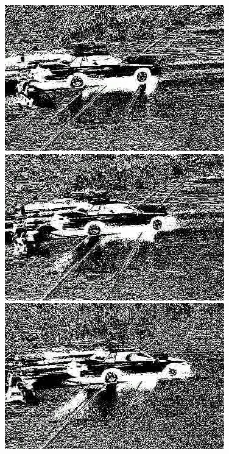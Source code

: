 \documentclass[a4paper]{ctexart}
\begin{document}
\begin{enumerate}[label=\arabic*、]
\begin{figure}[htbp]
\begin{minipage}[t]{0.2\textwidth}
		\end{minipage}
		\begin{minipage}[t]{0.2\textwidth}
			\centering
			\includegraphics[width=\textwidth]{figure/frames/avg19405.jpg}
		\end{minipage}
		\begin{minipage}[t]{0.2\textwidth}
			\centering
			\includegraphics[width=\textwidth]{figure/frames/avg19410.jpg}
		\end{minipage}
		\begin{minipage}[t]{0.2\textwidth}
			\centering
			\includegraphics[width=\textwidth]{figure/frames/avg19415.jpg}

\end{minipage}
\end{figure}
\end{enumerate}
\end{document}
